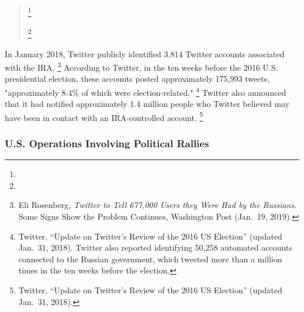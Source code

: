 \begin{quote}

\footnote{}

\footnote{}

\end{quote}

In January 2018, Twitter publicly identified 3,814 Twitter accounts associated with the IRA\null.%
\footnote{Eli Rosenberg, \textit{Twitter to Tell 677,000 Users they Were Had by the Russians}.
Some Signs Show the Problem Continues, Washington Post (Jan.~19, 2019).}
According to Twitter, in the ten weeks before the 2016 U.S. presidential election, these accounts posted approximately 175,993 tweets, "approximately 8.4\% of which were election-related."%
\footnote{Twitter, ``Update on Twitter's Review of the 2016 US Election'' (updated Jan.~31, 2018).
Twitter also reported identifying 50,258 automated accounts connected to the Russian government, which tweeted more than a million times in the ten weeks before the election.}
Twitter also announced that it had notified approximately 1.4 million people who Twitter believed may have been in contact with an IRA-controlled account.%
\footnote{Twitter, ``Update on Twitter's Review of the 2016 US Election'' (updated Jan.~31, 2018).}

\subsubsection{U.S. Operations Involving Political Rallies}

